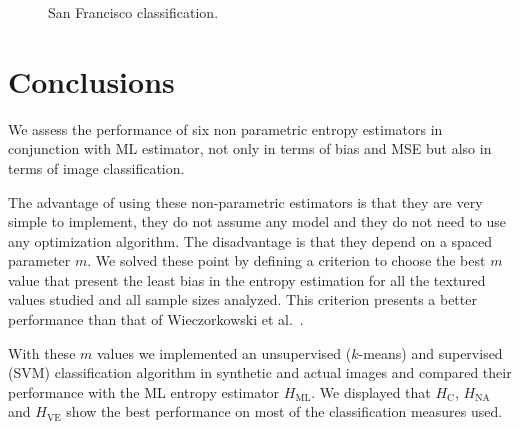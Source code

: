 \documentclass[journal]{IEEEtran}
\begin{document}
\begin{figure}[hbt]
	\caption{San Francisco classification.}
	\label{fig:class_SF}
	\end{figure}    
	
\section{Conclusions}
\label{sec:conclusions}

We assess the performance of six non parametric entropy estimators in conjunction with ML estimator, not only in terms of bias and MSE but also in terms of image classification. 

The advantage of using these non-parametric estimators is that they are very simple to implement, they do not assume any model and they do not need to use any optimization algorithm. The disadvantage is that they depend on a spaced parameter $m$. We solved these point by defining a criterion to choose the best $m$ value that present the least bias in the entropy estimation for all the textured values studied and all sample sizes analyzed. This criterion presents a better performance than that of Wieczorkowski et al.~\cite{Wieczorkowski1999}.

With these $m$ values we implemented an unsupervised ($k$-means) and supervised (SVM) classification  algorithm in synthetic and actual images and compared their performance with the ML entropy estimator $H_{\text{ML}}$. We displayed that $H_\text{C}$, $H_{\text{NA}}$ and $H_{\text{VE}}$ show the best performance on most of the classification measures used. 
\end{document}

